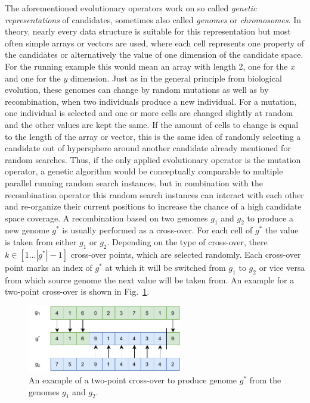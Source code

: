 The aforementioned evolutionary operators work on so called \textit{genetic representations} of candidates, sometimes also called \textit{genomes} or \textit{chromosomes}.
In theory, nearly every data structure is suitable for this representation but most often simple arrays or vectors are used, where each cell represents one property of the candidates or alternatively the value of one dimension of the candidate space.
For the running example this would mean an array with length 2, one for the $x$ and one for the $y$ dimension.\newline
Just as in the general principle from biological evolution, these genomes can change by random mutations as well as by recombination, when two individuals produce a new individual.
For a mutation, one individual is selected and one or more cells are changed slightly at random and the other values are kept the same.
If the amount of cells to change is equal to the length of the array or vector, this is the same idea of randomly selecting a candidate out of hypersphere around another candidate already mentioned for random searches.
Thus, if the only applied evolutionary operator is the mutation operator, a genetic algorithm would be conceptually comparable to multiple parallel running random search instances, but in combination with the recombination operator this random search instances can interact with each other and re-organize their current positions to increase the chance of a high candidate space coverage.\newline
A recombination based on two genomes $g_1$ and $g_2$ to produce a new genome $g^*$ is usually performed as a cross-over.
For each cell of $g^*$ the value is taken from either $g_1$ or $g_2$.
Depending on the type of cross-over, there $k \in [1 ... |g^*| - 1]$ cross-over points, which are selected randomly.
Each cross-over point marks an index of $g^*$ at which it will be switched from $g_1$ to $g_2$ or vice versa from which source genome the next value will be taken from.
An example for a two-point cross-over is shown in Fig.~\ref{fig:theory:crossover}.
\begin{figure}[ht!]
    \centering
    \includegraphics[width=0.6\textwidth,keepaspectratio]{gfx/Figures/Theory/Crossover.pdf}
    \caption{An example of a two-point cross-over to produce genome $g^*$ from the genomes $g_1$ and $g_2$.}
    \label{fig:theory:crossover}
\end{figure}


